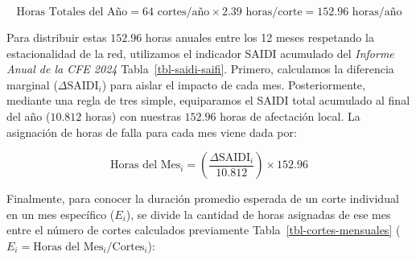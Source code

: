 \documentclass[
  spanish,
  letterpaper,
  DIV=11,
  numbers=noendperiod]{scrreprt}
\theoremstyle{plain}
\theoremstyle{definition}
\theoremstyle{remark}
\begin{document}
\[
\text{Horas Totales del Año} = 64 \text{ cortes/año} \times 2.39 \text{ horas/corte} = 152.96 \text{ horas/año}
\]

Para distribuir estas \(152.96\) horas anuales entre los 12 meses
respetando la estacionalidad de la red, utilizamos el indicador SAIDI
acumulado del \emph{Informe Anual de la CFE 2024}
Tabla~\ref{tbl-saidi-saifi}. Primero, calculamos la diferencia marginal
(\(\Delta \text{SAIDI}_i\)) para aislar el impacto de cada mes.
Posteriormente, mediante una regla de tres simple, equiparamos el SAIDI
total acumulado al final del año (\(10.812\) horas) con nuestras
\(152.96\) horas de afectación local. La asignación de horas de falla
para cada mes viene dada por:

\[
\text{Horas del Mes}_i = \left( \frac{\Delta \text{SAIDI}_i}{10.812} \right) \times 152.96
\]

Finalmente, para conocer la duración promedio esperada de un corte
individual en un mes específico (\(E_i\)), se divide la cantidad de
horas asignadas de ese mes entre el número de cortes calculados
previamente Tabla~\ref{tbl-cortes-mensuales}
(\(E_i = \text{Horas del Mes}_i / \text{Cortes}_i\)):
\end{document}
